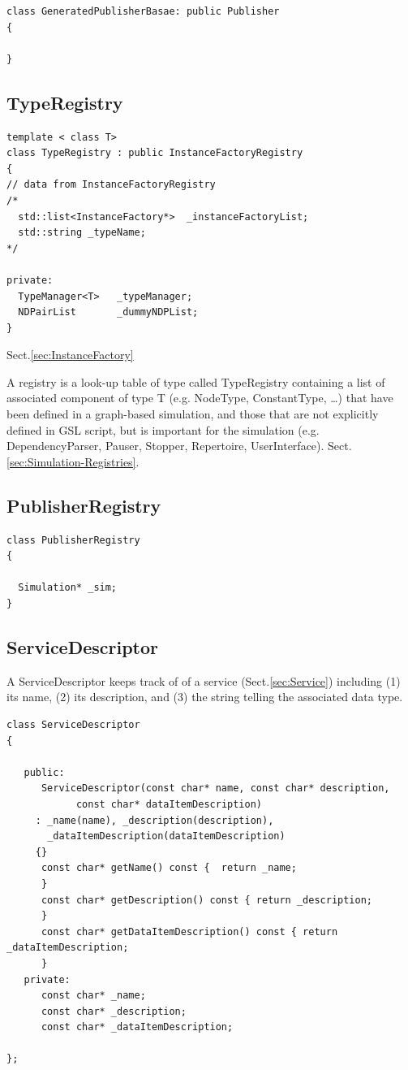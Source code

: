 \begin{verbatim}
class GeneratedPublisherBasae: public Publisher
{

}
\end{verbatim}


\subsection{TypeRegistry}
\label{sec:TypeRegistry}

\begin{verbatim}
template < class T>
class TypeRegistry : public InstanceFactoryRegistry
{
// data from InstanceFactoryRegistry
/*
  std::list<InstanceFactory*>  _instanceFactoryList;
  std::string _typeName;
*/

private:
  TypeManager<T>   _typeManager;
  NDPairList       _dummyNDPList;
}
\end{verbatim}
Sect.\ref{sec:InstanceFactory}

A registry is a look-up table of type called TypeRegistry containing a list of
associated component of type T (e.g. NodeType, ConstantType, \ldots) that have
been defined in a graph-based simulation, and those that are not explicitly defined
in GSL script, but is important for the simulation (e.g. DependencyParser,
Pauser, Stopper, Repertoire, UserInterface).
Sect.\ref{sec:Simulation-Registries}.




\subsection{PublisherRegistry}
\label{sec:PublisherRegistry}

\begin{lstlisting}
class PublisherRegistry
{

  Simulation* _sim;
}
\end{lstlisting}


\subsection{ServiceDescriptor}
\label{sec:ServiceDescriptor}

A ServiceDescriptor keeps track of of a service (Sect.\ref{sec:Service})
including (1) its name, (2) its description, and (3) the string telling the
associated data type.


\begin{lstlisting}
class ServiceDescriptor
{

   public:
      ServiceDescriptor(const char* name, const char* description, 
			const char* dataItemDescription)
	 : _name(name), _description(description), 
	   _dataItemDescription(dataItemDescription)
	 {}
      const char* getName() const {	 return _name;
      }
      const char* getDescription() const { return _description;
      }
      const char* getDataItemDescription() const { return _dataItemDescription;
      }
   private:
      const char* _name;
      const char* _description;
      const char* _dataItemDescription;

};
\end{lstlisting}

